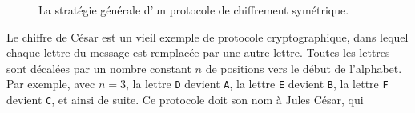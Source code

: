 \begin{figure}[h]
  \centering
  \caption{La stratégie générale d'un protocole de chiffrement symétrique.}
  \label{fig:crypto-sym}
\end{figure}
Le chiffre de César est un vieil exemple de protocole cryptographique, dans lequel
chaque lettre du message est remplacée par une autre lettre. Toutes les lettres
sont décalées par un nombre constant $n$ de positions vers le début de
l'alphabet. Par exemple, avec $n=3$, la lettre \texttt{D} devient \texttt{A}, la
lettre \texttt{E} devient \texttt{B}, la lettre \texttt{F} devient
\texttt{C}, et ainsi de suite. Ce protocole doit son nom à Jules César, qui
